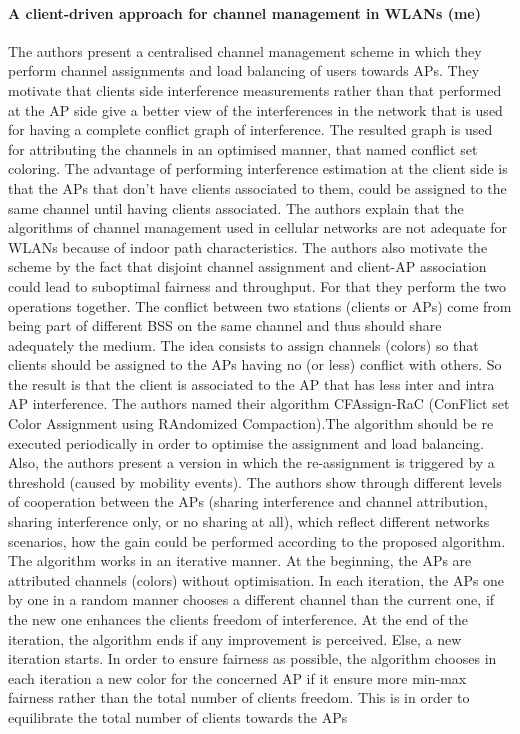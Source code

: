 \documentclass[journal,transmag]{IEEEtran}
\begin{document}
\paragraph{A client-driven approach for channel management in WLANs
\cite{06client_channel_WLAN} (me)}
The authors present a centralised channel management scheme in which they perform channel assignments and load balancing of users towards APs. They motivate that clients side interference measurements rather than that performed at the AP side give a better view of the interferences in the network that is used for having a complete conflict graph of interference. The resulted graph is used for attributing the channels in an optimised manner, that named conflict set coloring. The advantage of performing interference estimation at the client side is that the APs that don't have clients associated to them, could be assigned to the same channel until having clients associated. The authors explain that the algorithms of channel management used in cellular networks are not adequate for WLANs because of indoor path characteristics. The authors also motivate the scheme by the fact that disjoint channel assignment and client-AP association could lead to suboptimal fairness and throughput. For that they perform the two operations together. The conflict between two stations (clients or APs) come from being part of different BSS on the same channel and thus should share adequately the medium. The idea consists to assign channels (colors) so that clients should be assigned to the APs having no (or less) conflict with others. So the result is that the client is associated to the AP that has less inter and intra AP interference. The authors named their algorithm CFAssign-RaC (ConFlict set Color Assignment using RAndomized Compaction).The algorithm should be re executed periodically in order to optimise the assignment and load balancing. Also, the authors present a version in which the re-assignment is triggered by a threshold (caused by mobility events). The authors show through different levels of cooperation between the APs (sharing interference and channel attribution, sharing interference only, or no sharing at all), which reflect different networks scenarios, how the gain could be performed according to the proposed algorithm. The algorithm works in an iterative manner. At the beginning, the APs are attributed channels (colors) without optimisation. In each iteration, the APs one by one in a random manner chooses a different channel than the current one, if the new one enhances the clients freedom of interference. At the end of the iteration, the algorithm ends if any improvement is perceived. Else, a new iteration starts. In order to ensure fairness as possible, the algorithm chooses in each iteration a new color for the concerned AP if it ensure more min-max fairness rather than the total number of clients freedom. This is in order to equilibrate the total number of clients towards the APs\\
\end{document}
